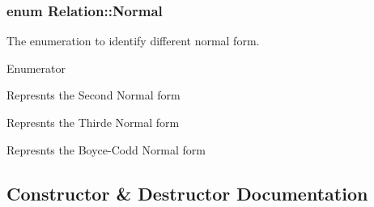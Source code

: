\subsubsection[{\texorpdfstring{Normal}{Normal}}]{\setlength{\rightskip}{0pt plus 5cm}enum {\bf Relation\+::\+Normal}}\hypertarget{class_relation_af4a36b464d672235cf91635f0816c95e}{}\label{class_relation_af4a36b464d672235cf91635f0816c95e}
The enumeration to identify different normal form. \begin{Desc}
\item[Enumerator]\par
\begin{description}
\item[{\em 
\+\_\+2\+NF\hypertarget{class_relation_af4a36b464d672235cf91635f0816c95eac6128494e3d974929ae5ecd2e2df07ce}{}\label{class_relation_af4a36b464d672235cf91635f0816c95eac6128494e3d974929ae5ecd2e2df07ce}
}]Represnts the Second Normal form \item[{\em 
\+\_\+3\+NF\hypertarget{class_relation_af4a36b464d672235cf91635f0816c95ea0fbd388d0f5a49eea7bdeea548be03a3}{}\label{class_relation_af4a36b464d672235cf91635f0816c95ea0fbd388d0f5a49eea7bdeea548be03a3}
}]Represnts the Thirde Normal form \item[{\em 
\+\_\+\+B\+C\+NF\hypertarget{class_relation_af4a36b464d672235cf91635f0816c95ea3e7f610cf0dcc22c6d1a3e654e7c16fa}{}\label{class_relation_af4a36b464d672235cf91635f0816c95ea3e7f610cf0dcc22c6d1a3e654e7c16fa}
}]Represnts the Boyce-\/\+Codd Normal form \end{description}
\end{Desc}


\subsection{Constructor \& Destructor Documentation}
